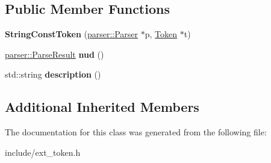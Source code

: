 \subsection*{Public Member Functions}
\begin{DoxyCompactItemize}
\item 
{\bfseries String\+Const\+Token} (\hyperlink{classfcal_1_1parser_1_1Parser}{parser\+::\+Parser} $\ast$p, \hyperlink{classfcal_1_1scanner_1_1Token}{Token} $\ast$t)\hypertarget{classfcal_1_1scanner_1_1StringConstToken_abdfef2a80a1b8c8546f053e0ca53efc9}{}\label{classfcal_1_1scanner_1_1StringConstToken_abdfef2a80a1b8c8546f053e0ca53efc9}

\item 
\hyperlink{classfcal_1_1parser_1_1ParseResult}{parser\+::\+Parse\+Result} {\bfseries nud} ()\hypertarget{classfcal_1_1scanner_1_1StringConstToken_a974609417de4cb5876a6e57a22e254e9}{}\label{classfcal_1_1scanner_1_1StringConstToken_a974609417de4cb5876a6e57a22e254e9}

\item 
std\+::string {\bfseries description} ()\hypertarget{classfcal_1_1scanner_1_1StringConstToken_adf08f9d8df7c7a996d81bf8d8f0f5b07}{}\label{classfcal_1_1scanner_1_1StringConstToken_adf08f9d8df7c7a996d81bf8d8f0f5b07}

\end{DoxyCompactItemize}
\subsection*{Additional Inherited Members}


The documentation for this class was generated from the following file\+:\begin{DoxyCompactItemize}
\item 
include/ext\+\_\+token.\+h\end{DoxyCompactItemize}
